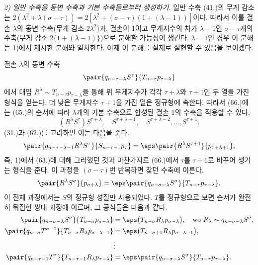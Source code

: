 
\emph{2) 일반 수축을 동변 수축과 기본 수축들로부터 생성하기.} 일반 수축 (41.)의 무게 감소는 $2(\lambda^2+\lambda(\sigma-\tau))=2[\lambda^2+(\sigma-\tau)(1+(\lambda-1))]$이다. 따라서 이를 결손 $\lambda$의 동변 수축(무게 감소 $2\lambda^2$)과, 결손이 1이고 무게지수의 차가 $\lambda-1$인 $\sigma-\tau$개의 수축(무게 감소 $2\{1+(\lambda-1)\}$)으로 분해할 가능성이 생긴다. $\lambda=1$인 경우 이 분해는 1)에서 제시한 분해와 일치한다. 이제 이 분해를 실제로 실현할 수 있음을 보이겠다.

결손 $\lambda$의 동변 수축
\[
 \pair{q_{n-\tau-\lambda}S^\tau}{T_{n-\tau}p_{\tau-\lambda}}
\]
에서 대입 $R^\lambda\sim T_{n-\tau}p_{\tau-\lambda}$을 통해 위 무게지수가 각각 $\tau+\lambda$와 $\tau+1$인 두 열을 가진 형식을 얻는다.
더 낮은 무게지수 $\tau+1$을 가진 열은 정규형에 속한다. 따라서 (66.)에는 (65.)의 순서에 따라 $\lambda$개의 기본 수축으로 합성된 결손 1의 수축을 적용할 수 있다.
\[
 (R^\lambda S^\tau)S^{\tau+\lambda},\quad S^{\tau+\lambda-1},\quad S^{\tau+\lambda-2},\ldots,S^{\tau+1}.
\]
(31.)과 (62.)를 고려하면 이는 다음을 준다.
\[
 \pair{q_{n-\tau-\lambda-1}R^\lambda S^\tau}{S_{n-\tau-1}p_\tau}=\eps\pair{R^\lambda S^{\tau+1}}{p_{\tau+\lambda+1}},
\]
즉, 1)에서 (63.)에 대해 그러했던 것과 마찬가지로 (66.)에서 $\tau$를 $\tau+1$로 바꾸어 생기는 형식을 준다. 이 과정을 $(\sigma-\tau)$번 반복하면 찾던 수축에 이른다.
\[
 \pair{R^\lambda S^\sigma}{p_{\sigma+\lambda}}=\eps\pair{q_{n-\sigma-\lambda}S^\sigma}{T_{n-\tau}p_{\tau-\lambda}}.
\]
이 전체 과정에서는 $S$의 정규형 성질만 사용되었다. $T$를 정규형으로 보면 순서가 완전히 뒤집힌 쌍대 과정에 이르며, 그 공식들은 다음과 같다.
\begin{align*}
\pair{q_{n-\sigma-\lambda}S^\sigma}{T_{n-\sigma}p_{\sigma-\lambda}}&=\eps\bigl(T_{n-\sigma}R_\lambda p_{\sigma-\lambda}\bigr),\quad \text{wo }R_\lambda\sim q_{n-\sigma-\lambda}S^\sigma,\\
\pair{q_{n-\sigma}T^{\sigma-1}}{T_{n-\sigma}R_\lambda p_{\sigma-\lambda-1}}&=\eps\bigl(T_{n-\sigma+1}R_\lambda p_{\sigma-\lambda-1}\bigr),\\
&\vdots\\
\pair{q_{n-\tau-1}T^\tau}{T_{n-\tau-1}R_\lambda p_{\tau-\lambda}}&=\eps\pair{q_{n-\sigma-\lambda}S^\sigma}{T_{n-\tau}p_{\tau-\lambda}}.
\end{align*}
